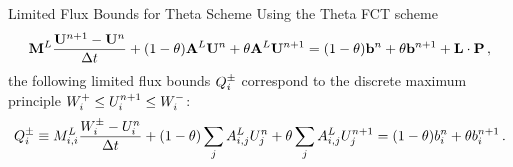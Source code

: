 \begin{theorem}{Limited Flux Bounds for Theta Scheme}
  Using the Theta FCT scheme
  \begin{equation}
    \lumpedmassmatrix\frac{\solutionvector^{\timeindex+1}
      - \solutionvector^\timeindex}{\timestepsize}
    + (1-\theta)\loworderssmatrix\solutionvector^\timeindex
    + \theta\loworderssmatrix\solutionvector^{\timeindex+1}
    = (1-\theta)\ssrhs^\timeindex + \theta\ssrhs^{\timeindex+1}
    + \limitedfluxsum \eqc
  \end{equation}
  the following limited flux bounds $Q_i^\pm$ correspond to the
  discrete maximum principle
  $W_i^+\le U_i^{n+1}\le W_i^-$:
  \begin{equation}
    Q_i^\pm \equiv M^L_{i,i}\frac{W_i^\pm
      - U_i^n}{\Delta t}
    +(1-\theta)\sum\limits_j A_{i,j}^L U_j^n
    +\theta\sum\limits_j A_{i,j}^L U_j^{n+1}
    =(1-\theta)b_i^n
    +\theta b_i^{n+1} \,.
  \end{equation}
\end{theorem}

